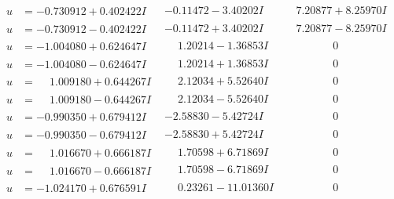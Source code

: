 \documentclass[1p]{elsarticle_modified}
\theoremstyle{definition}
\begin{document}
$$\begin{array}{c|c|c}
\begin{aligned}
u &= -0.730912 + 0.402422 I\end{aligned}
 & -0.11472 - 3.40202 I & \phantom{-}7.20877 + 8.25970 I \\ \hline\begin{aligned}
u &= -0.730912 - 0.402422 I\end{aligned}
 & -0.11472 + 3.40202 I & \phantom{-}7.20877 - 8.25970 I \\ \hline\begin{aligned}
u &= -1.004080 + 0.624647 I\end{aligned}
 & \phantom{-}1.20214 - 1.36853 I & \phantom{-0.000000 } 0 \\ \hline\begin{aligned}
u &= -1.004080 - 0.624647 I\end{aligned}
 & \phantom{-}1.20214 + 1.36853 I & \phantom{-0.000000 } 0 \\ \hline\begin{aligned}
u &= \phantom{-}1.009180 + 0.644267 I\end{aligned}
 & \phantom{-}2.12034 + 5.52640 I & \phantom{-0.000000 } 0 \\ \hline\begin{aligned}
u &= \phantom{-}1.009180 - 0.644267 I\end{aligned}
 & \phantom{-}2.12034 - 5.52640 I & \phantom{-0.000000 } 0 \\ \hline\begin{aligned}
u &= -0.990350 + 0.679412 I\end{aligned}
 & -2.58830 - 5.42724 I & \phantom{-0.000000 } 0 \\ \hline\begin{aligned}
u &= -0.990350 - 0.679412 I\end{aligned}
 & -2.58830 + 5.42724 I & \phantom{-0.000000 } 0 \\ \hline\begin{aligned}
u &= \phantom{-}1.016670 + 0.666187 I\end{aligned}
 & \phantom{-}1.70598 + 6.71869 I & \phantom{-0.000000 } 0 \\ \hline\begin{aligned}
u &= \phantom{-}1.016670 - 0.666187 I\end{aligned}
 & \phantom{-}1.70598 - 6.71869 I & \phantom{-0.000000 } 0 \\ \hline\begin{aligned}
u &= -1.024170 + 0.676591 I\end{aligned}
 & \phantom{-}0.23261 - 11.01360 I & \phantom{-0.000000 } 0 \\ \hline\begin{aligned}

\end{aligned}
\end{array}$$
\end{document}
